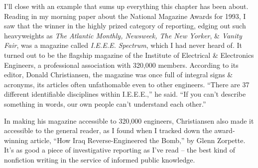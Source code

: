 \documentclass{article}
\begin{document}
I'll close with an example that sums up everything this chapter has been about. Reading in my morning paper about the National Magazine Awards for 1993, I saw that the winner in the highly prized category of reporting, edging out such heavyweights as \textit{The Atlantic Monthly, Newsweek, The New Yorker}, \& \textit{Vanity Fair}, was a magazine called \textit{I.E.E.E. Spectrum}, which I had never heard of. It turned out to be the flagship magazine of the Institute of Electrical \& Electronics Engineers, a professional association with 320,000 members. According to its editor, Donald Christiansen, the magazine was once full of integral signs \& acronyms, its articles often unfathomable even to other engineers. ``There are 37 different identifiable disciplines within I.E.E.E.,'' he said. ``If you can't describe something in words, our own people can't understand each other.''

In making his magazine accessible to 320,000 engineers, Christiansen also made it accessible to the general reader, as I found when I tracked down the award-winning article, ``How Iraq Reverse-Engineered the Bomb,'' by Glenn Zorpette. It's as good a piece of investigative reporting as I've read -- the best kind of nonfiction writing in the service of informed public knowledge.
\end{document}
